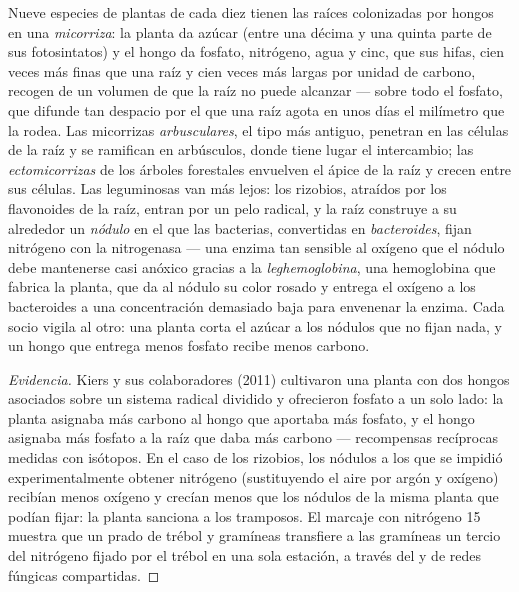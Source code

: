 \begin{proposition}\label{prop:b2:living-soil:symbiosis}
Nueve especies de plantas de cada diez tienen las raíces colonizadas por
hongos en una \emph{micorriza}: la planta da azúcar (entre una décima y una
quinta parte de sus fotosintatos) y el hongo da fosfato, nitrógeno, agua y
cinc, que sus hifas, cien veces más finas que una raíz y cien veces más
largas por unidad de carbono, recogen de un volumen de  que la raíz
no puede alcanzar --- sobre todo el fosfato, que difunde tan despacio por
el  que una raíz agota en unos días el milímetro que la rodea. Las
micorrizas \emph{arbusculares}, el tipo más antiguo, penetran en las
células de la raíz y se ramifican en arbúsculos, donde tiene lugar el
intercambio; las \emph{ectomicorrizas} de los árboles forestales envuelven
el ápice de la raíz y crecen entre sus células. Las leguminosas van más
lejos: los rizobios, atraídos por los flavonoides de la raíz, entran por un
pelo radical, y la raíz construye a su alrededor un \emph{nódulo} en el que
las bacterias, convertidas en \emph{bacteroides}, fijan nitrógeno con la
nitrogenasa --- una enzima tan sensible al oxígeno que el nódulo debe
mantenerse casi anóxico gracias a la \emph{leghemoglobina}, una
hemoglobina que fabrica la planta, que da al nódulo su color rosado y
entrega el oxígeno a los bacteroides a una concentración demasiado baja
para envenenar la enzima. Cada socio vigila al otro: una planta corta el
azúcar a los nódulos que no fijan nada, y un hongo que entrega menos
fosfato recibe menos carbono.
\end{proposition}
\begin{proof}[Evidencia]
Kiers y sus colaboradores (2011) cultivaron una planta con dos hongos
asociados sobre un sistema radical dividido y ofrecieron fosfato a un solo
lado: la planta asignaba más carbono al hongo que aportaba más fosfato, y
el hongo asignaba más fosfato a la raíz que daba más carbono --- recompensas
recíprocas medidas con isótopos. En el caso de los rizobios, los nódulos a
los que se impidió experimentalmente obtener nitrógeno (sustituyendo el
aire por argón y oxígeno) recibían menos oxígeno y crecían menos que los
nódulos de la misma planta que podían fijar: la planta sanciona a los
tramposos. El marcaje con nitrógeno 15 muestra que un prado de trébol y
gramíneas transfiere a las gramíneas un tercio del nitrógeno fijado por el
trébol en una sola estación, a través del  y de redes fúngicas
compartidas.
\end{proof}

